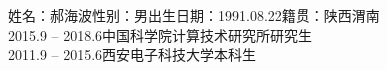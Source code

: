 

%
\begin{flushleft}
	姓名：郝海波\qquad 性别：男\qquad 出生日期：1991.08.22\qquad 籍贯：陕西渭南\\
	\vspace{2ex}
	2015.9 – 2018.6\qquad\qquad 中国科学院计算技术研究所研究生\\
	2011.9 – 2015.6\qquad\qquad 西安电子科技大学本科生
\end{flushleft}

%
%
%
%
%
%
%

